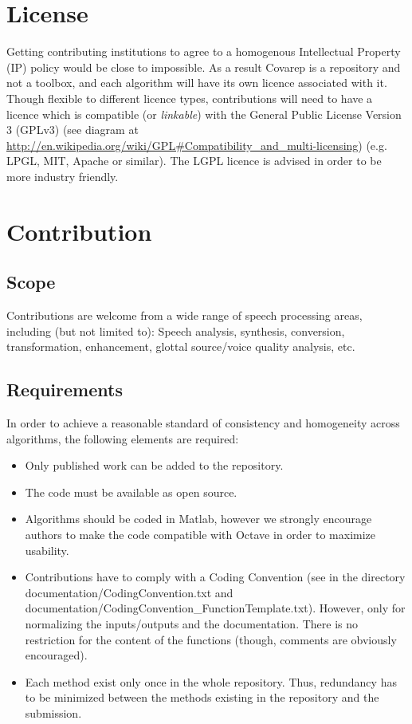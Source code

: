 \documentclass{article}
\begin{document}
\newpage

\section{License}
    Getting contributing institutions to agree to a homogenous Intellectual Property (IP) policy would be close to impossible. As a result Covarep is a repository and not a toolbox, and each algorithm will have its own licence associated with it. Though flexible to different licence types, contributions will need to have a licence which is compatible (or \textit{linkable}) with the General Public License Version 3 (GPLv3)
    (see diagram at \url{http://en.wikipedia.org/wiki/GPL#Compatibility\_and_multi-licensing}) (e.g. LPGL, MIT, Apache or similar).
    The LGPL licence is advised in order to be more industry friendly.


\section{Contribution}
    \subsection{Scope}
    Contributions are welcome from a wide range of speech processing areas, including (but not limited to): Speech analysis, synthesis, conversion, transformation, enhancement, glottal source/voice quality analysis, etc.

    \subsection{Requirements}
    In order to achieve a reasonable standard of consistency and homogeneity across algorithms, the following elements are required:
    \begin{itemize}
    \item Only published work can be added to the repository.
    \item The code must be available as open source.
    \item Algorithms should be coded in Matlab, however we strongly encourage authors to make the code compatible with Octave in order to maximize usability.

    \item Contributions have to comply with a Coding Convention (see in the directory \\ documentation/CodingConvention.txt and \\ documentation/CodingConvention\_FunctionTemplate.txt). However, only for normalizing the inputs/outputs and the documentation. There is no restriction for the content of the functions (though, comments are obviously encouraged).

    \item Each method exist only once in the whole repository. Thus, redundancy has to be minimized between the methods existing in the repository and the submission.
    \end{itemize}
\end{document}
